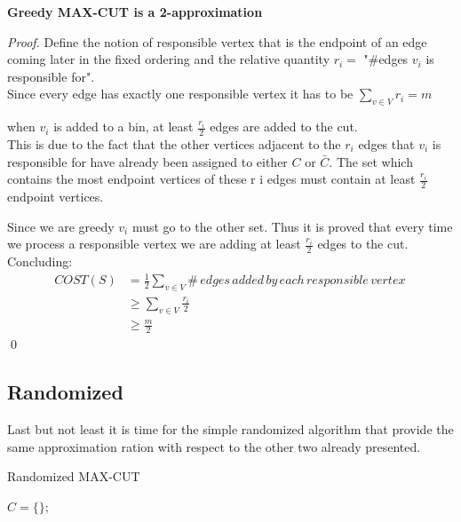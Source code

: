 \begin{theorem}{\textbf{Greedy MAX-CUT is a 2-approximation}}
\end{theorem}
\begin{proof}
  Define the notion of responsible vertex that is the endpoint of an edge coming later in the fixed ordering 
  and the relative quantity $r_i =$ "\#edges $v_i$ is responsible for".\\
  Since every edge has exactly one responsible vertex it has to be $\sum_{v \in V} r_i = m$
  \begin{claim}
  	when $ v_i $ is added to a bin, at least $ \frac{r_i}{2}$ edges are added to the cut.\\
  	This is due to the fact that the other vertices
  	adjacent to the $ r_i $ edges that $ v_i $ is responsible for have already been assigned to either $C$ or $ \bar{C} $. 
  	The set which contains the most endpoint vertices of these r i edges must contain at least $ \frac{r_i}{2} $ endpoint vertices.

  \end{claim}
  Since we are greedy $ v_i $ must go to the other set. Thus it is proved that every time we process a responsible vertex we are adding at least $ \frac{r_i}{2}$ edges to the cut. Concluding:
  \begin{align*}
  	COST(S) & = \frac{1}{2} \sum_{v \in V} \#\, edges\,added\,by\,each \,responsible \,vertex\,\\ 
			& \geq \sum_{v \in V} \frac{r_i}{2}  \\
			& \geq \frac{m}{2}
\end{align*}
  \qed
\end{proof}


\subsection{Randomized}
Last but not least it is time for the simple randomized algorithm that provide the same approximation ration with respect to the other two already presented.

\begin{algorithm}[H]
	\SetAlgoLined
	\caption{Randomized MAX-CUT}
	$C =\{\}$;\\
\end{algorithm}
\bigskip

